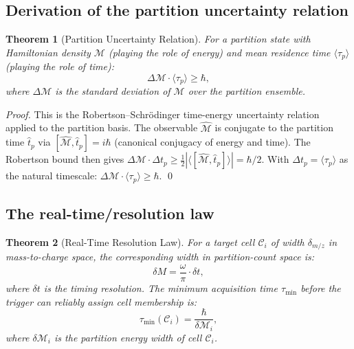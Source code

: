 \documentclass[twocolumn,10pt,a4paper]{article}
\theoremstyle{thmstyle}
\newtheorem{theorem}{Theorem}[section]
\theoremstyle{definition}
\theoremstyle{remark}
\newcommand{\calC}{\mathcal{C}}
\newcommand{\Mop}{\mathcal{M}}
\newcommand{\tp}{\langle\tau_{p}\rangle}
\begin{document}
\subsection{Derivation of the partition uncertainty relation}

\begin{theorem}[Partition Uncertainty Relation]
\label{thm:uncertainty}
For a partition state with Hamiltonian density $\Mop$ (playing the role
of energy) and mean residence time $\tp$ (playing the role of time):
\begin{equation}
\Delta\Mop \cdot \tp \geq \hbar,
\label{eq:uncertainty}
\end{equation}
where $\Delta\Mop$ is the standard deviation of $\Mop$ over the
partition ensemble.
\end{theorem}

\begin{proof}
This is the Robertson--Schr{\"o}dinger time-energy uncertainty relation
\citep{robertson1929,heisenberg1927} applied to the partition basis.
The observable $\hat{\Mop}$ is conjugate to the partition time $\hat{t}_p$
via $[\hat{\Mop}, \hat{t}_p] = i\hbar$ (canonical conjugacy of energy
and time). The Robertson bound then gives
$\Delta\Mop \cdot \Delta t_p \geq \tfrac{1}{2}|{\langle[\hat{\Mop},\hat{t}_p]\rangle}|
= \hbar/2$.
With $\Delta t_p = \tp$ as the natural timescale:
$\Delta\Mop \cdot \tp \geq \hbar$. \qed
\end{proof}

\subsection{The real-time/resolution law}

\begin{theorem}[Real-Time Resolution Law]
\label{thm:resolution-law}
For a target cell $\calC_i$ of width $\delta_{m/z}$ in mass-to-charge
space, the corresponding width in partition-count space is:
\begin{equation}
\delta M = \frac{\omega}{\pi}\cdot\delta t,
\label{eq:dm-dt}
\end{equation}
where $\delta t$ is the timing resolution.
The minimum acquisition time $\tau_{\min}$ before the trigger can
reliably assign cell membership is:
\begin{equation}
\tau_{\min}(\calC_i) = \frac{\hbar}{\delta\Mop_i},
\label{eq:taumin}
\end{equation}
where $\delta\Mop_i$ is the partition energy width of cell $\calC_i$.
\end{theorem}
\end{document}
